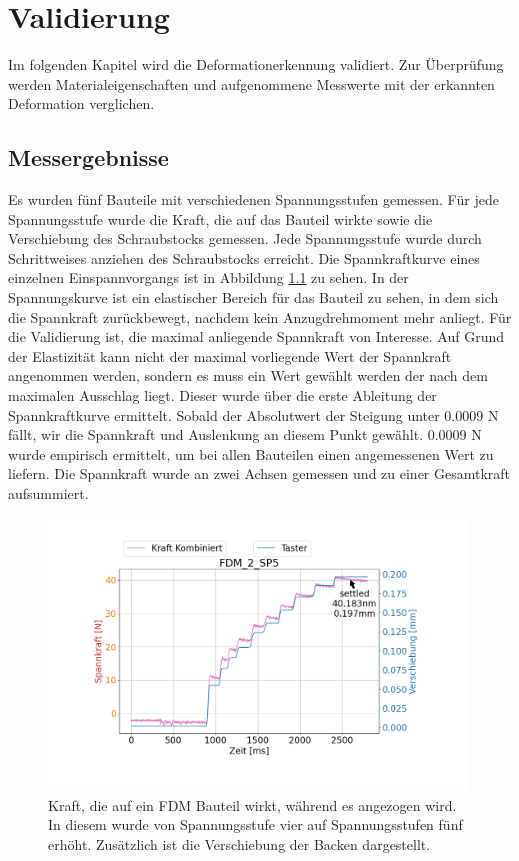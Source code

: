 
\chapter{Validierung}

Im folgenden Kapitel wird die Deformationerkennung validiert.
Zur Überprüfung werden Materialeigenschaften und aufgenommene Messwerte 
mit der erkannten Deformation verglichen.

\section{Messergebnisse} \label{validation}

Es wurden fünf Bauteile mit verschiedenen Spannungsstufen gemessen. Für jede 
Spannungsstufe wurde die Kraft, die auf das Bauteil wirkte sowie die Verschiebung 
des Schraubstocks gemessen.
Jede Spannungsstufe wurde durch Schrittweises anziehen des Schraubstocks erreicht.
Die Spannkraftkurve eines einzelnen Einspannvorgangs ist in 
Abbildung \ref{fig:single} zu sehen. 
In der Spannungskurve ist ein elastischer Bereich für das 
Bauteil zu sehen, in dem sich die Spannkraft zurückbewegt, nachdem kein 
Anzugdrehmoment mehr anliegt. Für die Validierung ist, die maximal anliegende 
Spannkraft von Interesse. Auf Grund der Elastizität kann nicht der maximal vorliegende 
Wert der Spannkraft angenommen werden, 
sondern es muss ein Wert gewählt werden der nach dem maximalen Ausschlag liegt.
Dieser wurde über die erste Ableitung der Spannkraftkurve ermittelt. Sobald der 
Absolutwert der Steigung unter 0.0009 N fällt, wir die Spannkraft und Auslenkung an 
diesem Punkt gewählt. 0.0009 N wurde empirisch ermittelt, um bei allen Bauteilen einen 
angemessenen Wert zu liefern.
Die Spannkraft wurde an zwei Achsen gemessen und zu einer Gesamtkraft aufsummiert.

\begin{figure}[H]
    \centering
    \includegraphics[width=0.99\textwidth]{images/spannkraftstufen_single.png}
    \caption{Kraft, die auf ein FDM Bauteil wirkt, während es angezogen wird. In diesem 
    wurde von Spannungsstufe vier auf Spannungsstufen fünf erhöht. Zusätzlich ist 
    die Verschiebung der Backen dargestellt.}
    \label{fig:single}
\end{figure}

